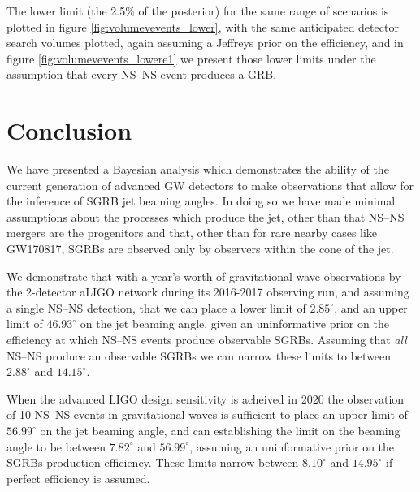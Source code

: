 \documentclass[twocolumn]{aastex61}
\newcommand{\BNS}{\ac{NS}--\ac{NS}\xspace}
\begin{document}
The lower limit (the 2.5\% of the posterior) for the same range of
scenarios is plotted in figure \ref{fig:volumevevents_lower}, with the
same anticipated detector search volumes plotted, again assuming a
Jeffreys prior on the efficiency, and in figure
\ref{fig:volumevevents_lowere1} we present those lower limits under
the assumption that every \BNS event produces a \ac{GRB}.

\section{Conclusion}

We have presented a Bayesian analysis which demonstrates the ability
of the current generation of advanced \ac{GW} detectors to make observations
that allow for the inference of \ac{SGRB} jet beaming angles. In doing so we
have made minimal assumptions about the processes which produce the jet, other
than that \BNS mergers are the progenitors and that, other than for rare nearby
cases like GW170817, \acp{SGRB} are observed only by observers within the cone
of the jet.

We demonstrate that with a year's worth of gravitational wave
observations by the 2-detector \ac{aLIGO} network during its 2016-2017
observing run, and assuming a single \BNS detection, that we can place
a lower limit of $2.85^{\circ}$, and an upper limit of $46.93^{\circ}$
on the jet beaming angle, given an uninformative prior on the
efficiency at which \BNS events produce observable
\acp{SGRB}. Assuming that \emph{all} \BNS produce an observable
\acp{SGRB} we can narrow these limits to between $2.88^{\circ}$ and
$14.15^{\circ}$.

When the advanced LIGO design sensitivity is acheived in 2020 the
observation of 10 \BNS events in gravitational waves is sufficient to
place an upper limit of $56.99^{\circ}$ on the jet beaming angle, and can
establishing the limit on the beaming angle to be between
$7.82^{\circ}$ and $56.99^{\circ}$, assuming an uninformative prior on
the \acp{SGRB} production efficiency. These limits narrow between
$8.10^{\circ}$ and $14.95^{\circ}$ if perfect efficiency is assumed.




\end{document}
